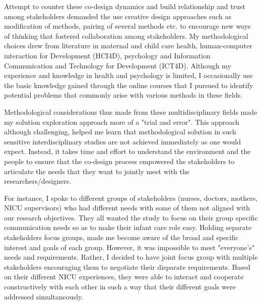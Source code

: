 Attempt to counter these co-design dynamics and build relationship and trust among stakeholders demanded the use creative design approaches such as modification of methods, pairing of several methods etc. to encourage new ways of thinking that fostered collaboration among stakeholders. My methodological choices drew from literature in maternal and child care health, human-computer interaction for Development (HCI4D), psychology and Information Communication and Technology for Development (ICT4D). Although my experience and knowledge in health and psychology is limited, I occasionally use the basic knowledge gained through the online courses that I pursued to identify potential problems that commonly arise with various methods in these fields. 

Methodological considerations thus made from these multidisciplinary fields made my solution exploration approach more of a "trial and error". This approach although challenging, helped me learn that methodological solution in such sensitive interdisciplinary studies are not achieved immediately as one would expect. Instead, it takes time and effort to understand the environment and the people to ensure that the co-design process empowered the stakeholders to articulate the needs that they want to jointly meet with the researchers/designers.

For instance, I spoke to different groups of stakeholders (nurses, doctors, mothers, NICU supervisors) who had different needs with some of them not aligned with our research objectives. They all wanted the study to focus on their group specific communication needs so as to make their infant care role easy. Holding separate stakeholders focus groups, made me become aware of the broad and specific interest and goals of each group.  However, it was impossible to meet "everyone's" needs and requirements. Rather, I decided to have joint focus group with multiple stakeholders encouraging them to negotiate their disparate requirements. Based on their different NICU experiences, they were able to interact and cooperate constructively with each other in such a way that their different goals were addressed simultaneously.

